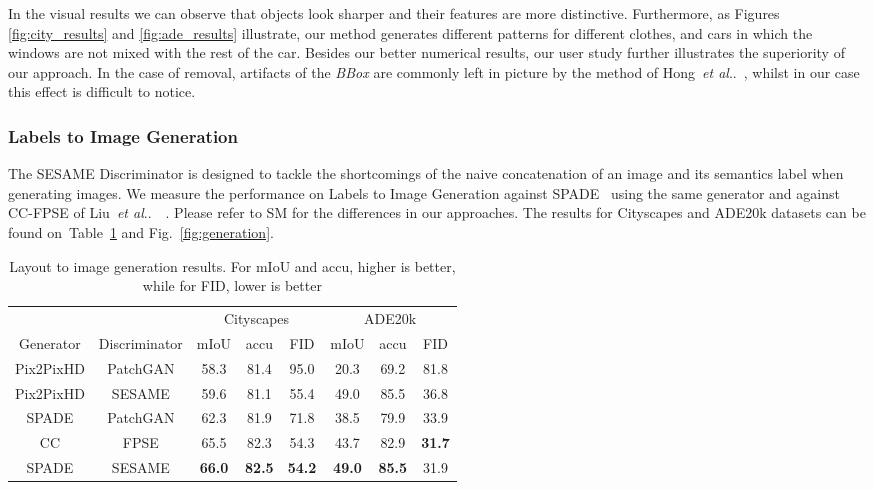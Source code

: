 \documentclass[runningheads]{llncs}
\makeatletter
\DeclareRobustCommand\onedot{\futurelet\@let@token\@onedot}
\def\@onedot{\ifx\@let@token.\else.\null\fi\xspace}
\def\etal{\emph{et al}\onedot}
\def\hong{Hong~\etal~\cite{hong2018learning}}
\def\liu{Liu~\etal~\cite{liu2019learning}\ }
\newcommand{\fref}[1]{Fig.~\ref{#1}}
\newcommand{\tref}[1]{Table~\ref{#1}}
\makeatother
\begin{document}
In the visual results we can observe that objects look sharper and their features are more distinctive.
Furthermore, as Figures \ref{fig:city_results} and \ref{fig:ade_results} illustrate, our method generates different patterns for different clothes, and cars in which the windows are not mixed with the rest of the car. Besides our better numerical results, our user study further illustrates the superiority of our approach.
In the case of removal, artifacts of the \textit{BBox} are commonly left in picture by the method of 
\hong{}, whilst in our case this effect is difficult to notice. 

\subsubsection{Labels to Image Generation}

The SESAME Discriminator is designed to tackle the shortcomings of the naive concatenation of an image and its semantics label when generating images.
We measure the performance on Labels to Image Generation against SPADE~\cite{park2019SPADE} using the same generator and against CC-FPSE of \liu{}. Please refer to SM for the differences in our approaches. 
The results for Cityscapes and ADE20k datasets can be found on~\tref{table:generation} and \fref{fig:generation}.

\begin{table}[t]
\begin{center}
\caption{Layout to image generation results. For mIoU and accu, higher is better, while for FID, lower is better}
\label{table:generation}
\begin{tabular}{c|c|ccc|ccc}
\multicolumn{2}{c}{} &  \multicolumn{3}{c}{Cityscapes} &  \multicolumn{3}{c}{ADE20k} \\
\cline{3-8}
Generator & Discriminator & mIoU & accu & FID & mIoU & accu & FID \\
\hline
Pix2PixHD & PatchGAN & 58.3 & 81.4 & 95.0 & {20.3} & 69.2 & 81.8 \\
Pix2PixHD & SESAME & 59.6 & 81.1 & 55.4 & 49.0 & 85.5 & 36.8 \\
SPADE & PatchGAN & 62.3 & 81.9 & 71.8 &  38.5 & 79.9 & 33.9 \\
CC & FPSE & 65.5 & 82.3 & 54.3 &  43.7 & 82.9 & \textbf{31.7} \\
SPADE & SESAME & \textbf{66.0} & \textbf{82.5} & \textbf{54.2} & \textbf{49.0} & \textbf{85.5} & 31.9 \\

\end{tabular}
\end{center}
\end{table}
\end{document}
